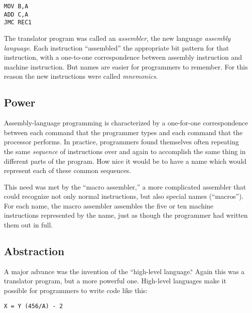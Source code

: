 \begin{verbatim}
MOV B,A
ADD C,A
JMC REC1
\end{verbatim}
The translator program was called an \emph{assembler}, the new language
\emph{assembly language}. Each instruction {}``assembled'' the appropriate
bit pattern for that instruction, with a one-to-one correspondence
between assembly instruction and machine instruction. But names are
easier for programmers to remember. For this reason the new instructions
were called \emph{mnemonics}.


\subsection{Power}

Assembly-language programming is characterized by a one-for-one correspondence
between each command that the programmer types and each command that
the processor performs. In practice, programmers found themselves
often repeating the same \emph{sequence} of instructions over and
again to accomplish the same thing in different parts of the program.
How nice it would be to have a name which would represent each of
these common sequences.

This need was met by the {}``macro assembler,'' a more complicated
assembler that could recognize not only normal instructions, but also
special names ({}``macros''). For each name, the macro assembler
assembles the five or ten machine instructions represented by the
name, just as though the programmer had written them out in full.


\subsection{Abstraction}

A major advance was the invention of the {}``high-level language.\char`\"{}
Again this was a translator program, but a more powerful one. High-level
languages make it possible for programmers to write code like this:

\begin{verbatim}
X = Y (456/A) - 2
\end{verbatim}


